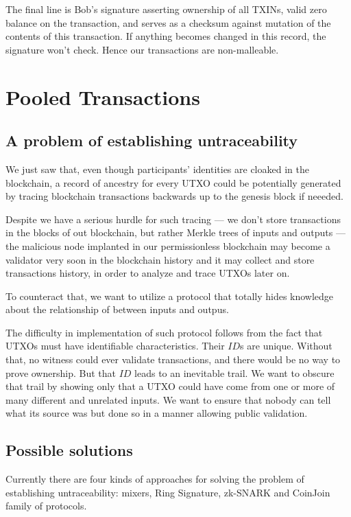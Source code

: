 \documentclass[a4paper, 10pt, conference]{ieeeconf}
\begin{document}
The final line is Bob's signature asserting ownership of all TXINs, valid zero balance on the transaction, and serves as a checksum against mutation of the contents of this transaction. If anything becomes changed in this record, the signature won't check. Hence our transactions are non-malleable.

\section{Pooled Transactions}\label{pooled_tx}

\subsection{A problem of establishing untraceability}
We just saw that, even though participants' identities are cloaked in the blockchain, a record of ancestry for every UTXO could be potentially generated by tracing blockchain transactions backwards up to the genesis block if neeeded.

Despite we have a serious hurdle for such tracing --- we don't store transactions in the blocks of out blockchain, but rather Merkle trees of inputs and outputs --- the malicious node implanted in our permissionless blockchain may become a validator very soon in the blockchain history and it may collect and store transactions history, in order to analyze and trace UTXOs later on.

To counteract that, we want to utilize a protocol that totally hides knowledge about the relationship of between inputs and outpus.

The difficulty in implementation of such protocol follows from the fact that UTXOs must have identifiable characteristics. Their $ID$s are unique. Without that, no witness could ever validate transactions, and there would be no way to prove ownership. But that $ID$ leads to an inevitable trail. We want to obscure that trail by showing only that a UTXO could have come from one or more of many different and unrelated inputs. We want to ensure that nobody can tell what its source was but done so in a manner allowing public validation.

\subsection{Possible solutions}
Currently there are four kinds of approaches for solving the problem of establishing untraceability: mixers, Ring Signature, zk-SNARK and CoinJoin family of protocols.
\end{document}
